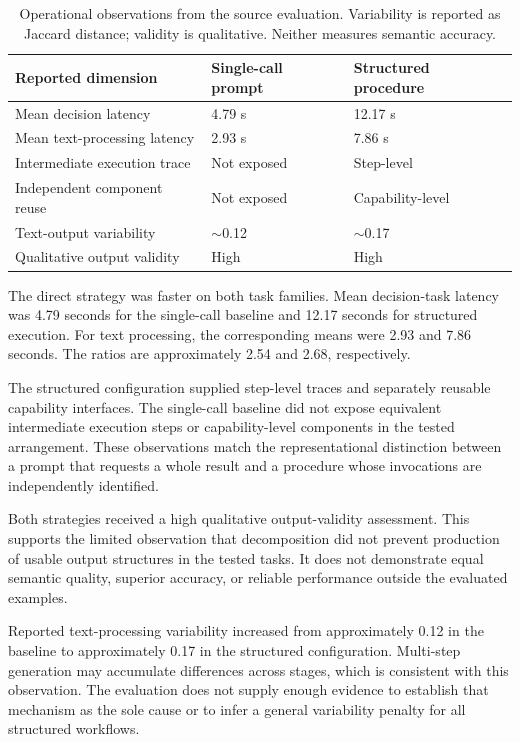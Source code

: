 \documentclass[10pt,twocolumn,a4paper]{article}
\begin{document}
\begin{table}[t]
\centering
\caption{Operational observations from the source evaluation. Variability is reported as Jaccard distance; validity is qualitative. Neither measures semantic accuracy.}
\label{tab:results}
\small
\begin{tabular}{@{}p{7.4cm}ll@{}}
\toprule
Reported dimension & Single-call prompt & Structured procedure\\
\midrule
Mean decision latency & 4.79 s & 12.17 s\\
Mean text-processing latency & 2.93 s & 7.86 s\\
Intermediate execution trace & Not exposed & Step-level\\
Independent component reuse & Not exposed & Capability-level\\
Text-output variability & $\sim$0.12 & $\sim$0.17\\
Qualitative output validity & High & High\\
\bottomrule
\end{tabular}
\end{table}

The direct strategy was faster on both task families. Mean decision-task latency was 4.79 seconds for the single-call baseline and 12.17 seconds for structured execution. For text processing, the corresponding means were 2.93 and 7.86 seconds. The ratios are approximately 2.54 and 2.68, respectively.


The structured configuration supplied step-level traces and separately reusable capability interfaces. The single-call baseline did not expose equivalent intermediate execution steps or capability-level components in the tested arrangement. These observations match the representational distinction between a prompt that requests a whole result and a procedure whose invocations are independently identified.


Both strategies received a high qualitative output-validity assessment. This supports the limited observation that decomposition did not prevent production of usable output structures in the tested tasks. It does not demonstrate equal semantic quality, superior accuracy, or reliable performance outside the evaluated examples.


Reported text-processing variability increased from approximately 0.12 in the baseline to approximately 0.17 in the structured configuration. Multi-step generation may accumulate differences across stages, which is consistent with this observation. The evaluation does not supply enough evidence to establish that mechanism as the sole cause or to infer a general variability penalty for all structured workflows.
\end{document}
